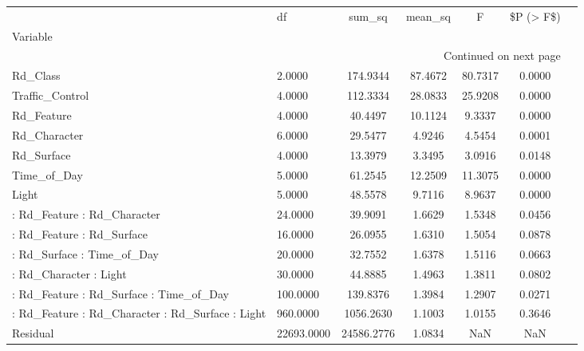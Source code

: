 \begin{longtable}{p{6cm}lccccc}
\toprule
{} &         df &     sum\_sq &  mean\_sq &       F &  \$P (> F\$) \\
Variable                                          &            &            &          &         &            \\
\midrule
\endhead
\midrule
\multicolumn{6}{r}{{Continued on next page}} \\
\midrule
\endfoot

\bottomrule
\endlastfoot
Rd\_Class                                          &     2.0000 &   174.9344 &  87.4672 & 80.7317 &     0.0000 \\
Traffic\_Control                                   &     4.0000 &   112.3334 &  28.0833 & 25.9208 &     0.0000 \\
Rd\_Feature                                        &     4.0000 &    40.4497 &  10.1124 &  9.3337 &     0.0000 \\
Rd\_Character                                      &     6.0000 &    29.5477 &   4.9246 &  4.5454 &     0.0001 \\
Rd\_Surface                                        &     4.0000 &    13.3979 &   3.3495 &  3.0916 &     0.0148 \\
Time\_of\_Day                                       &     5.0000 &    61.2545 &  12.2509 & 11.3075 &     0.0000 \\
Light                                             &     5.0000 &    48.5578 &   9.7116 &  8.9637 &     0.0000 \\
 : Rd\_Feature : Rd\_Character                      &    24.0000 &    39.9091 &   1.6629 &  1.5348 &     0.0456 \\
 : Rd\_Feature : Rd\_Surface                        &    16.0000 &    26.0955 &   1.6310 &  1.5054 &     0.0878 \\
 : Rd\_Surface : Time\_of\_Day                       &    20.0000 &    32.7552 &   1.6378 &  1.5116 &     0.0663 \\
 : Rd\_Character : Light                           &    30.0000 &    44.8885 &   1.4963 &  1.3811 &     0.0802 \\
 : Rd\_Feature : Rd\_Surface : Time\_of\_Day          &   100.0000 &   139.8376 &   1.3984 &  1.2907 &     0.0271 \\
 : Rd\_Feature : Rd\_Character : Rd\_Surface : Light &   960.0000 &  1056.2630 &   1.1003 &  1.0155 &     0.3646 \\
Residual                                          & 22693.0000 & 24586.2776 &   1.0834 &     NaN &        NaN \\
\end{longtable}
